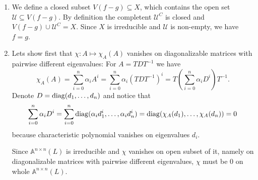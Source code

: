\begin{exercise}{3}
    \begin{enumerate}
        \item{} We define a closed subset $V(f - g) \subseteq X$, which contains
            the open set $\mathcal{U} \subseteq V(f - g)$. By definition the
            completent $\mathcal{U}^C$ is closed and $V(f - g) \cup
            \mathcal{U}^C = X$. Since $X$ is irreducible and $\mathcal{U}$ is
            non-empty, we have $f = g$.

        \item{} Lets show first that $\chi \colon A \mapsto \chi_A(A)$ vanishes
            on diagonalizable matrices with pairwise different eigenvalues: For
            $A = T D T^{-1}$ we have
            \begin{equation*}
                \chi_A(A) = \sum^n_{i = 0} \alpha_i A^i = \sum^n_{i = 0}
                \alpha_i (T D T^{-1})^i = T \left( \sum^n_{i = 0} \alpha_i  D^i
                \right) T^{-1}.
            \end{equation*}
            Denote $D = \operatorname{diag}(d_1, \dots, d_n)$ and notice that
            \begin{equation*}
                \sum^n_{i = 0} \alpha_i  D^i = 
                \sum^n_{i = 0} \operatorname{diag}(\alpha_i d^i_1, \dots, \alpha_i d^i_n) = 
                \operatorname{diag}(\chi_A(d_1), \dots, \chi_A(d_n)) = 0
            \end{equation*}
            because characteristic polynomial vanishes on eigenvalues $d_i$.

            Since $\mathbb{A}^{n \times n}(L)$ is irreducible
            and $\chi$ vanishes on open subset of it, namely on diagonalizable
            matrices with pairwise different eigenvalues, $\chi$ must be $0$ on
            whole $\mathbb{A}^{n \times n}(L)$.
    \end{enumerate}
\end{exercise}


